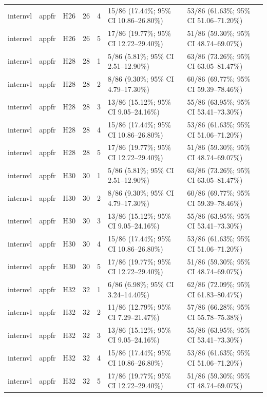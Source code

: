 \begin{longtable}{lllrrll}
internvl & appfr & H26 & 26 & 4 & 15/86 (17.44\%; 95\% CI 10.86–26.80\%) & 53/86 (61.63\%; 95\% CI 51.06–71.20\%) \\
internvl & appfr & H26 & 26 & 5 & 17/86 (19.77\%; 95\% CI 12.72–29.40\%) & 51/86 (59.30\%; 95\% CI 48.74–69.07\%) \\
internvl & appfr & H28 & 28 & 1 & 5/86 (5.81\%; 95\% CI 2.51–12.90\%) & 63/86 (73.26\%; 95\% CI 63.05–81.47\%) \\
internvl & appfr & H28 & 28 & 2 & 8/86 (9.30\%; 95\% CI 4.79–17.30\%) & 60/86 (69.77\%; 95\% CI 59.39–78.46\%) \\
internvl & appfr & H28 & 28 & 3 & 13/86 (15.12\%; 95\% CI 9.05–24.16\%) & 55/86 (63.95\%; 95\% CI 53.41–73.30\%) \\
internvl & appfr & H28 & 28 & 4 & 15/86 (17.44\%; 95\% CI 10.86–26.80\%) & 53/86 (61.63\%; 95\% CI 51.06–71.20\%) \\
internvl & appfr & H28 & 28 & 5 & 17/86 (19.77\%; 95\% CI 12.72–29.40\%) & 51/86 (59.30\%; 95\% CI 48.74–69.07\%) \\
internvl & appfr & H30 & 30 & 1 & 5/86 (5.81\%; 95\% CI 2.51–12.90\%) & 63/86 (73.26\%; 95\% CI 63.05–81.47\%) \\
internvl & appfr & H30 & 30 & 2 & 8/86 (9.30\%; 95\% CI 4.79–17.30\%) & 60/86 (69.77\%; 95\% CI 59.39–78.46\%) \\
internvl & appfr & H30 & 30 & 3 & 13/86 (15.12\%; 95\% CI 9.05–24.16\%) & 55/86 (63.95\%; 95\% CI 53.41–73.30\%) \\
internvl & appfr & H30 & 30 & 4 & 15/86 (17.44\%; 95\% CI 10.86–26.80\%) & 53/86 (61.63\%; 95\% CI 51.06–71.20\%) \\
internvl & appfr & H30 & 30 & 5 & 17/86 (19.77\%; 95\% CI 12.72–29.40\%) & 51/86 (59.30\%; 95\% CI 48.74–69.07\%) \\
internvl & appfr & H32 & 32 & 1 & 6/86 (6.98\%; 95\% CI 3.24–14.40\%) & 62/86 (72.09\%; 95\% CI 61.83–80.47\%) \\
internvl & appfr & H32 & 32 & 2 & 11/86 (12.79\%; 95\% CI 7.29–21.47\%) & 57/86 (66.28\%; 95\% CI 55.78–75.38\%) \\
internvl & appfr & H32 & 32 & 3 & 13/86 (15.12\%; 95\% CI 9.05–24.16\%) & 55/86 (63.95\%; 95\% CI 53.41–73.30\%) \\
internvl & appfr & H32 & 32 & 4 & 15/86 (17.44\%; 95\% CI 10.86–26.80\%) & 53/86 (61.63\%; 95\% CI 51.06–71.20\%) \\
internvl & appfr & H32 & 32 & 5 & 17/86 (19.77\%; 95\% CI 12.72–29.40\%) & 51/86 (59.30\%; 95\% CI 48.74–69.07\%) \\

\end{longtable}
